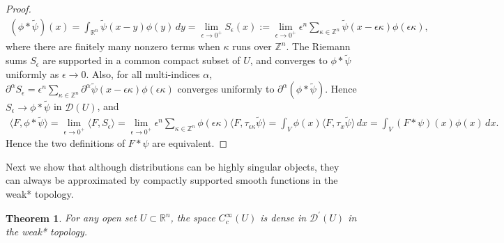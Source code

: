 \documentclass{article}
\numberwithin{equation}{section}
\newcommand{\bbR}{\mathbb{R}}
\newcommand{\bbZ}{\mathbb{Z}}
\renewcommand{\cal}{\mathcal}
\newcommand{\wt}{\widetilde}
\theoremstyle{plain}
\newtheorem{theorem}{Theorem}[section]
\theoremstyle{definition}
\begin{document}
\begin{proof}
\begin{align*}
(\phi*\wt\psi)(x)=\int_{\bbR^n}\wt\psi(x-y)\phi(y)\,dy=\lim_{\epsilon\to 0^+}S_\epsilon(x):=\lim_{\epsilon\to 0^+}\epsilon^n\sum_{\kappa\in\bbZ^n}\wt\psi(x-\epsilon\kappa)\phi(\epsilon\kappa),
\end{align*}
where there are finitely many nonzero terms when $\kappa$ runs over $\bbZ^n$. The Riemann sums $S_\epsilon$ are supported in a common compact subset of $U$, and converges to $\phi*\wt\psi$ uniformly as $\epsilon\to 0$. Also, for all multi-indices $\alpha$, $\partial^\alpha S_\epsilon=\epsilon^n\sum_{\kappa\in\bbZ^n}\partial^\alpha\wt\psi(x-\epsilon\kappa)\phi(\epsilon\kappa)$ converges uniformly to $\partial^\alpha(\phi*\wt\psi)$. Hence $S_\epsilon\to\phi*\wt\psi$ in $\cal{D}(U)$, and
\begin{align*}
	\langle F,\phi*\wt\psi\rangle=\lim_{\epsilon\to 0^+}\langle F,S_\epsilon\rangle=\lim_{\epsilon\to 0^+}\epsilon^n\sum_{\kappa\in\bbZ^n}\phi(\epsilon\kappa)\langle F,\tau_{\epsilon\kappa}\wt\psi\rangle=\int_V\phi(x)\langle F,\tau_x\wt\psi\rangle\,dx=\int_V(F*\psi)(x)\phi(x)\,dx.
\end{align*}
Hence the two definitions of $F*\psi$ are equivalent.
\end{proof}

Next we show that although distributions can be highly singular objects, they can always be approximated by compactly supported smooth functions in the weak* topology.

\begin{theorem}\label{ccdenseinDpr}
For any open set $U\subset\bbR^n$, the space $C_c^\infty(U)$ is dense in $\cal{D}^\prime(U)$ in the weak* topology.
\end{theorem}
\end{document}
